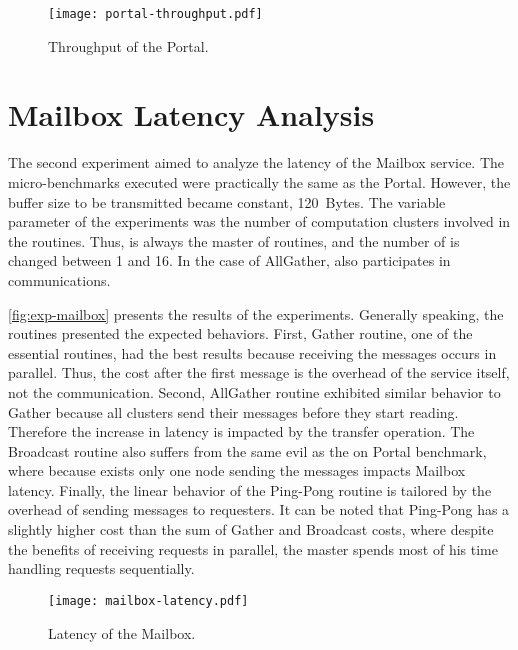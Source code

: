 		\begin{figure}[!tb]
			\centering%
			\caption{Throughput of the Portal.}%
			\label{fig:exp-portal}%
			\texttt{[image: portal-throughput.pdf]}%
		\end{figure}

	\section{Mailbox Latency Analysis}

		The second experiment aimed to analyze the latency of the Mailbox
		service. The micro-benchmarks executed were practically the same
		as the Portal. However, the buffer size to be transmitted became
		constant, 120~Bytes. The variable parameter of the experiments was
		the number of computation clusters involved in the routines.
		Thus, \iocluster is always the master of routines, and the number
		of \ccluster is changed between 1 and 16. In the case of AllGather,
		\iocluster also participates in communications.

		\autoref{fig:exp-mailbox} presents the results of the experiments.
		Generally speaking, the routines presented the expected behaviors.
		First, Gather routine, one of the essential routines, had the best
		results because receiving the messages occurs in parallel. Thus,
		the cost after the first message is the overhead of the service
		itself, not the communication. Second, AllGather routine exhibited
		similar behavior to Gather because all clusters send their messages
		before they start reading. Therefore the increase in latency is
		impacted by the transfer operation. The Broadcast routine also
		suffers from the same evil as the on Portal benchmark, where because
		exists only one node sending the messages impacts Mailbox latency.
		Finally, the linear behavior of the Ping-Pong routine is tailored
		by the overhead of sending messages to requesters. It can be noted
		that Ping-Pong has a slightly higher cost than the sum of Gather
		and Broadcast costs, where despite the benefits of receiving
		requests in parallel, the master spends most of his time handling
		requests sequentially.

		\begin{figure}[!tb]
			\centering%
			\caption{Latency of the Mailbox.}%
			\label{fig:exp-mailbox}%
			\texttt{[image: mailbox-latency.pdf]}%
		\end{figure}
